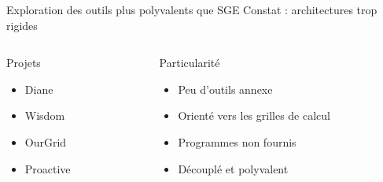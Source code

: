 \documentclass{beamer}
\begin{document}
\begin{frame}{Exploration des outils plus polyvalents que SGE}
    Constat : architectures trop rigides %
	\begin{columns}
	\begin{column}[l]{0.3\linewidth}
    \begin{block}{Projets}
        \begin{itemize}
            \item<2-> Diane
            \item<3-> Wisdom
            \item<4-> OurGrid
            \item<5-> Proactive
        \end{itemize}
    \end{block}
	\end{column}
	\begin{column}[r]{0.6\linewidth}
    \begin{exampleblock}{Particularité}
        \begin{itemize}
            \item<2-> Peu d'outils annexe
            \item<3-> Orienté vers les grilles de calcul
            \item<4-> Programmes non fournis
            \item<5-> Découplé et polyvalent
        \end{itemize}
    \end{exampleblock}
	\end{column}
	\end{columns}
\end{frame}

\end{document}
